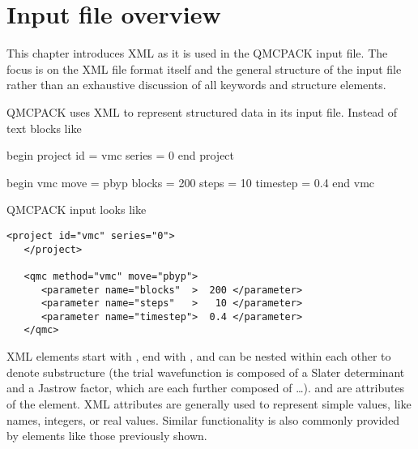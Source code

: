 \chapter{Input file overview}
\label{chap:input_overview}

This chapter introduces XML as it is used in the QMCPACK input file.  The focus is on the XML file format itself and the general structure of the input file rather than an exhaustive discussion of all keywords and structure elements.  

QMCPACK uses XML to represent structured data in its input file.  Instead of text blocks like

\begin{shade}
begin project
  id     = vmc
  series = 0
end project

begin vmc
  move     = pbyp
  blocks   = 200
  steps    =  10
  timestep = 0.4
end vmc
\end{shade} 
QMCPACK input looks like
\begin{lstlisting}[style=QMCPXML]
   <project id="vmc" series="0">
   </project>

   <qmc method="vmc" move="pbyp">
      <parameter name="blocks"  >  200 </parameter>
      <parameter name="steps"   >   10 </parameter>
      <parameter name="timestep">  0.4 </parameter>
   </qmc>
\end{lstlisting}
XML elements start with , end with , and can be nested within each other to denote substructure (the trial wavefunction is composed of a Slater determinant and a Jastrow factor, which are each further composed of \ldots).   and  are attributes of the  element.  XML attributes are generally used to represent simple values, like names, integers, or real values.  Similar functionality is also commonly provided by  elements like those previously shown.

